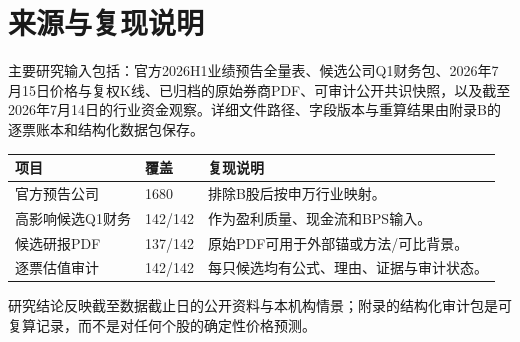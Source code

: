 \section{来源与复现说明}

主要研究输入包括：官方2026H1业绩预告全量表、候选公司Q1财务包、2026年7月15日价格与复权K线、已归档的原始券商PDF、可审计公开共识快照，以及截至2026年7月14日的行业资金观察。详细文件路径、字段版本与重算结果由附录B的逐票账本和结构化数据包保存。

\noindent
\begin{exhibitbox}[研究数据覆盖与复现状态]
\begin{tabularx}{\textwidth}{L{4.5cm}R{2.0cm}X}
\toprule
\textbf{项目} & \textbf{覆盖} & \textbf{复现说明} \\
\midrule
官方预告公司 & 1680 & 排除B股后按申万行业映射。 \\
高影响候选Q1财务 & 142/142 & 作为盈利质量、现金流和BPS输入。 \\
候选研报PDF & 137/142 & 原始PDF可用于外部锚或方法/可比背景。 \\
逐票估值审计 & 142/142 & 每只候选均有公式、理由、证据与审计状态。 \\
\bottomrule
\end{tabularx}
\end{exhibitbox}

研究结论反映截至数据截止日的公开资料与本机构情景；附录的结构化审计包是可复算记录，而不是对任何个股的确定性价格预测。
